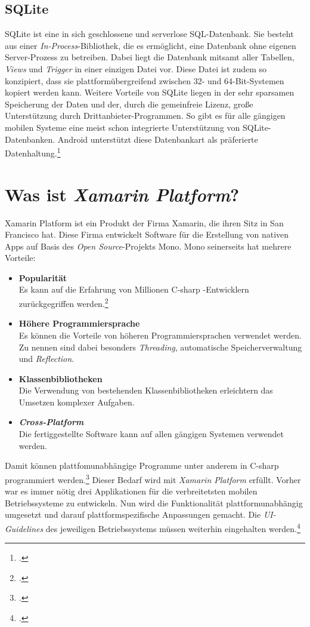 \subsection{SQLite}
\label{ssec:android-sqlite}
SQLite ist eine in sich geschlossene und serverlose \ac{SQL}-Datenbank. Sie besteht aus einer \textit{In-Process}-Bibliothek, die es ermöglicht, eine Datenbank ohne eigenen Server-Prozess zu betreiben. Dabei liegt die Datenbank mitsamt aller Tabellen, \textit{Views} und \textit{\gls{Trigger}} in einer einzigen Datei vor. Diese Datei ist zudem so konzipiert, dass sie plattformübergreifend zwischen 32- und 64-Bit-Systemen kopiert werden kann. Weitere Vorteile von SQLite liegen in der sehr sparsamen Speicherung der Daten und der, durch die gemeinfreie Lizenz, große Unterstützung durch Drittanbieter-Programmen. So gibt es für alle gängigen mobilen Systeme eine meist schon integrierte Unterstützung von SQLite-Datenbanken. Android unterstützt diese Datenbankart als präferierte Datenhaltung.\footcite[S. 226f.]{Android-BeckerPant}
\section{Was ist \textit{Xamarin Platform}?}
\label{sec:defintion-xamarin}
Xamarin Platform ist ein Produkt der Firma Xamarin, die ihren Sitz in San Francisco hat. Diese Firma entwickelt Software für die Erstellung von nativen Apps auf Basis des \textit{Open Source}-Projekts \gls{Mono}. Mono seinerseits hat mehrere Vorteile:
\begin{itemize}
\item \textbf{Popularität}\\Es kann auf die Erfahrung von Millionen \gls{C-sharp} -Entwicklern zurückgegriffen werden.\footcite{Xamarin-Platform}
\item \textbf{Höhere Programmiersprache} \\Es können die Vorteile von höheren Programmiersprachen verwendet werden. Zu nennen sind dabei besonders \textit{Threading}, automatische Speicherverwaltung und \textit{\gls{Reflection}}.
\item \textbf{Klassenbibliotheken}\\Die Verwendung von bestehenden Klassenbibliotheken erleichtern das Umsetzen komplexer Aufgaben.
\item \textbf{\textit{Cross-Platform}}\\Die fertiggestellte Software kann auf allen gängigen Systemen verwendet werden.
\end{itemize}
Damit können plattfomunabhängige Programme unter anderem in \gls{C-sharp} programmiert werden.\footcite{Xamarin-Multiplatform} Dieser Bedarf wird mit \textit{Xamarin Platform} erfüllt. Vorher war es immer nötig drei Applikationen für die verbreitetsten mobilen Betriebssysteme zu entwickeln. Nun wird die Funktionalität plattformunabhängig umgesetzt und darauf plattformspezifische Anpassungen gemacht. Die \textit{UI-Guidelines} des jeweiligen Betriebssystems müssen weiterhin eingehalten werden.\footcite{Xamarin-Platform}
